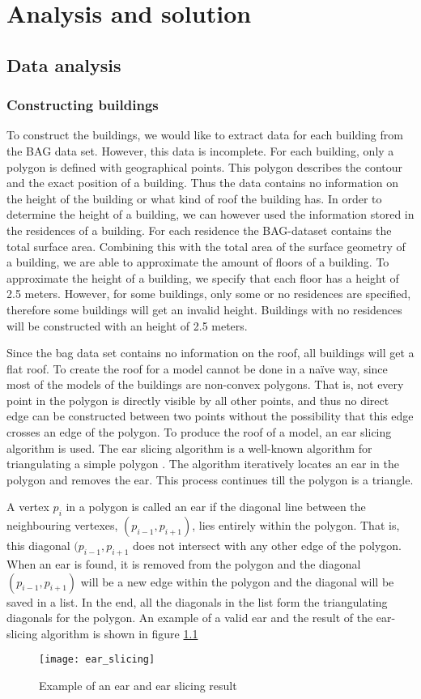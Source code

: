 \chapter{Analysis and solution}
\label{chap:AnalysisAndSolution}
\section{Data analysis}
\label{sec:DataAnalysis}
\subsection{Constructing buildings}
To construct the buildings, we would like to extract data for each building from the BAG data set. However, this data is incomplete. For each building, only a polygon is defined with geographical points. This polygon describes the contour and the exact position of a building. Thus the data contains no information on the height of the building or what kind of roof the building has. In order to determine the height of a building, we can however used the information stored in the residences of a building. For each residence the BAG-dataset contains the total surface area. Combining this with the total area of the surface geometry of a building, we are able to approximate the amount of floors of a building. To approximate the height of a building, we specify that each floor has a height of 2.5 meters. However, for some buildings, only some or no residences are specified, therefore some buildings will get an invalid height. Buildings with no residences will be constructed with an height of 2.5 meters.

Since the bag data set contains no information on the roof, all buildings will get a flat roof. To create the roof for a model cannot be done in a naïve way, since most of the models of the buildings are non-convex polygons. That is, not every point in the polygon is directly visible by all other points, and thus no direct edge can be constructed between two points without the possibility that this edge crosses an edge of the polygon. To produce the roof of a model, an ear slicing algorithm is used. The ear slicing algorithm is a well-known algorithm for triangulating a simple polygon \cite{Kajak11}. The algorithm iteratively locates an ear in the polygon and removes the ear. This process continues till the polygon is a triangle.

A vertex $p_i$ in a polygon is called an ear if the diagonal line between the neighbouring vertexes, $(p_{i-1}, p_{i+1})$, lies entirely within the polygon. That is, this diagonal $(p_{i-1}, p_{i+1}$ does not intersect with any other edge of the polygon. When an ear is found, it is removed from the polygon and the diagonal $(p_{i-1}, p_{i+1})$ will be a new edge within the polygon and the diagonal will be saved in a list. In the end, all the diagonals in the list form the triangulating diagonals for the polygon. An example of a valid ear and the result of the ear-slicing algorithm is shown in figure \ref{fig:ear_slicing}
\begin{figure}[htb!]
    \centering
    \texttt{[image: ear\_slicing]}
    \caption{Example of an ear and ear slicing result}
    \label{fig:ear_slicing}
\end{figure}

